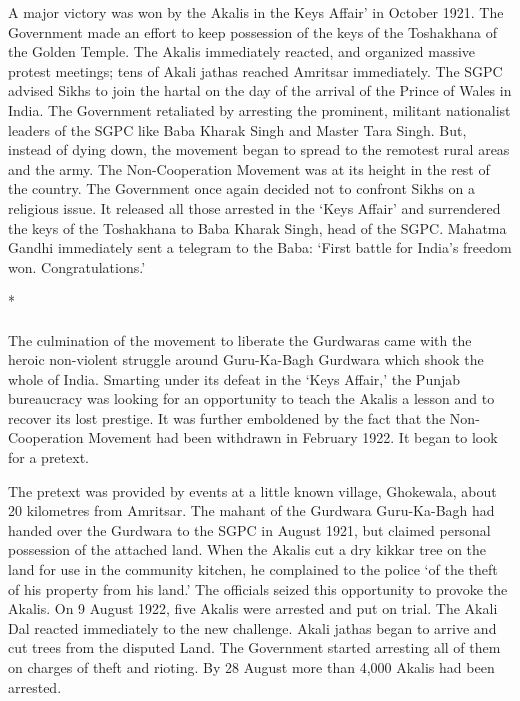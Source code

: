 \begin{multicols}{2}
A major victory was won by the Akalis in the Keys Affair' in October 1921. The Government made an effort to keep possession of the keys of the Toshakhana of the Golden Temple. The Akalis immediately reacted, and organized massive protest meetings; tens of Akali jathas reached Amritsar immediately. The SGPC advised Sikhs to join the hartal on the day of the arrival of the Prince of Wales in India. The Government retaliated by arresting the prominent, militant nationalist leaders of the SGPC like Baba Kharak Singh and Master Tara Singh. But, instead of dying down, the movement began to spread to the remotest rural areas and the army. The Non-Cooperation Movement was at its height in the rest of the country. The Government once again decided not to confront Sikhs on a religious issue. It released all those arrested in the `Keys Affair' and surrendered the keys of the Toshakhana to Baba Kharak Singh, head of the SGPC. Mahatma Gandhi immediately sent a telegram to the Baba: `First battle for India's freedom won. Congratulations.'

\begin{center}*\end{center}

\paragraph*{}

The culmination of the movement to liberate the Gurdwaras came with the heroic non-violent struggle around Guru-Ka-Bagh Gurdwara which shook the whole of India. Smarting under its defeat in the `Keys Affair,' the Punjab bureaucracy was looking for an opportunity to teach the Akalis a lesson and to recover its lost prestige. It was further emboldened by the fact that the Non- Cooperation Movement had been withdrawn in February 1922. It began to look for a pretext.

The pretext was provided by events at a little known village, Ghokewala, about 20 kilometres from Amritsar. The mahant of the Gurdwara Guru-Ka-Bagh had handed over the Gurdwara to the SGPC in August 1921, but claimed personal possession of the attached land. When the Akalis cut a dry kikkar tree on the land for use in the community kitchen, he complained to the police `of the theft of his property from his land.' The officials seized this opportunity to provoke the Akalis. On 9 August 1922, five Akalis were arrested and put on trial. The Akali Dal reacted immediately to the new challenge. Akali jathas began to arrive and cut trees from the disputed Land. The Government started arresting all of them on charges of theft and rioting. By 28 August more than 4,000 Akalis had been arrested.


\end{multicols}
